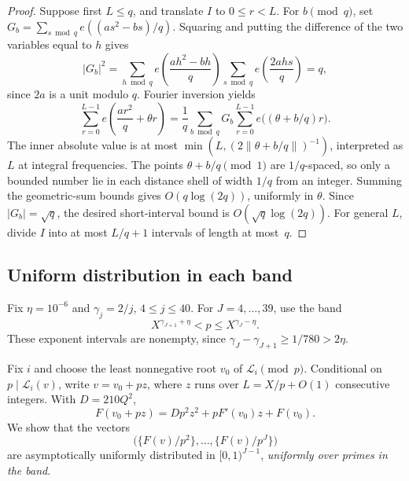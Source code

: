 \documentclass[11pt,a4paper]{article}
\newcommand{\LL}{\mathcal L}
\newcommand{\1}{\mathbf 1}
\numberwithin{equation}{section}
\begin{document}
\begin{proof}
Suppose first \(L\leq q\), and translate \(I\) to \(0\leq r<L\).
For \(b\pmod q\), set
\(G_b=\sum_{s\bmod q}e((as^2-bs)/q)\). Squaring and putting the
difference of the two variables equal to \(h\) gives
\[
 |G_b|^2=\sum_{h\bmod q}e\!\left(\frac{ah^2-bh}{q}\right)
                 \sum_{s\bmod q}e\!\left(\frac{2ahs}{q}\right)=q,
\]
since \(2a\) is a unit modulo \(q\). Fourier inversion yields
\[
 \sum_{r=0}^{L-1}e\!\left(\frac{ar^2}{q}+\theta r\right)
 =\frac1q\sum_{b\bmod q}G_b
                  \sum_{r=0}^{L-1}e\bigl((\theta+b/q)r\bigr).
\]
The inner absolute value is at most
\(\min(L,(2\|\theta+b/q\|)^{-1})\), interpreted as \(L\) at integral
frequencies. The points \(\theta+b/q\pmod1\) are \(1/q\)-spaced, so
only a bounded number lie in each distance shell of width \(1/q\) from
an integer. Summing the geometric-sum bounds gives \(O(q\log(2q))\),
uniformly in \(\theta\). Since \(|G_b|=\sqrt q\), the desired short-interval
bound is \(O(\sqrt q\log(2q))\). For general \(L\), divide \(I\) into
at most \(L/q+1\) intervals of length at most~\(q\).
\end{proof}

\subsection{Uniform distribution in each band}

Fix \(\eta=10^{-6}\) and \(\gamma_j=2/j\), \(4\leq j\leq40\).
For \(J=4,\ldots,39\), use the band
\begin{equation}\label{eq:bands}
 X^{\gamma_{J+1}+\eta}<p\leq X^{\gamma_J-\eta}.
\end{equation}
These exponent intervals are nonempty, since
\(\gamma_J-\gamma_{J+1}\geq1/780>2\eta\).

Fix \(i\) and choose the least nonnegative root \(v_0\) of
\(\LL_i\pmod p\). Conditional on \(p\mid\LL_i(v)\), write
\(v=v_0+pz\), where \(z\) runs over \(L=X/p+O(1)\) consecutive
integers. With \(D=210Q^2\),
\begin{equation}\label{eq:expandedphase}
 F(v_0+pz)=Dp^2z^2+pF'(v_0)z+F(v_0).
\end{equation}
We show that the vectors
\[
 \bigl(\{F(v)/p^2\},\ldots,\{F(v)/p^J\}\bigr)
\]
are asymptotically uniformly distributed in \([0,1)^{J-1}\),
\emph{uniformly over primes in the band}.
\end{document}
